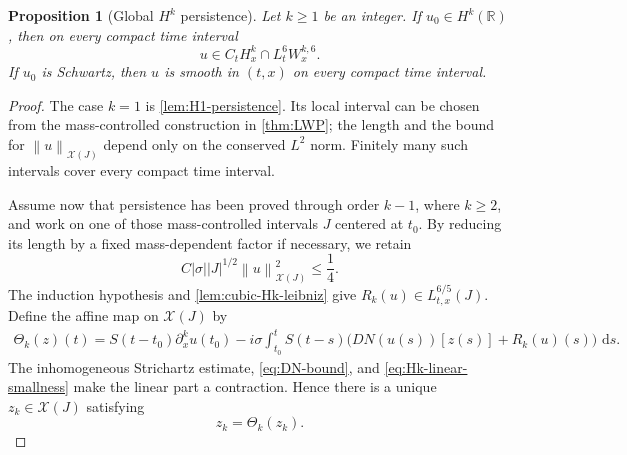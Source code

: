 \documentclass[11pt,oneside]{book}
\newtheorem{proposition}[theorem]{Proposition}
\theoremstyle{definition}
\theoremstyle{remark}
\newcommand{\R}{\mathbb R}
\newcommand{\1}{\mathbf 1}
\newcommand{\dd}{\,\mathrm d}
\newcommand{\norm}[1]{\left\lVert #1\right\rVert}
\begin{document}
\begin{proposition}[Global $H^k$ persistence]
\label{prop:Hk-persistence}
Let $k\ge1$ be an integer.  If $u_0\in H^k(\R)$, then on every compact time
interval
\[
 u\in C_tH^k_x\cap L^6_tW^{k,6}_x.
\]
If $u_0$ is Schwartz, then $u$ is smooth in $(t,x)$ on every compact time
interval.
\end{proposition}

\begin{proof}
The case $k=1$ is \cref{lem:H1-persistence}.  Its local interval can be
chosen from the mass-controlled construction in \cref{thm:LWP}; the length
and the bound for $\norm u_{\mathcal X(J)}$ depend only on the conserved
$L^2$ norm.  Finitely many such intervals cover every compact time interval.

Assume now that persistence has been proved through order $k-1$, where
$k\ge2$, and work on one of those mass-controlled intervals $J$ centered at
$t_0$.  By reducing its length by a fixed mass-dependent factor if necessary,
we retain
\begin{equation}
 C|\sigma||J|^{1/2}\norm u_{\mathcal X(J)}^2\le\frac14.          \label{eq:Hk-linear-smallness}
\end{equation}
The induction hypothesis and \cref{lem:cubic-Hk-leibniz} give
$R_k(u)\in L^{6/5}_{t,x}(J)$.  Define the affine map on
$\mathcal X(J)$ by
\begin{align}
 \Theta_k(z)(t)=S(t-t_0)\partial_x^ku(t_0)
 -i\sigma\int_{t_0}^tS(t-s)
 \bigl(DN(u(s))[z(s)]+R_k(u)(s)\bigr)\,\dd s.       \label{eq:Hk-affine-map}
\end{align}
The inhomogeneous Strichartz estimate, \eqref{eq:DN-bound}, and
\eqref{eq:Hk-linear-smallness} make the linear part a contraction.  Hence
there is a unique $z_k\in\mathcal X(J)$ satisfying
\begin{equation}
 z_k=\Theta_k(z_k).                                  \label{eq:zk-fixed}
\end{equation}


\end{proof}
\end{document}
